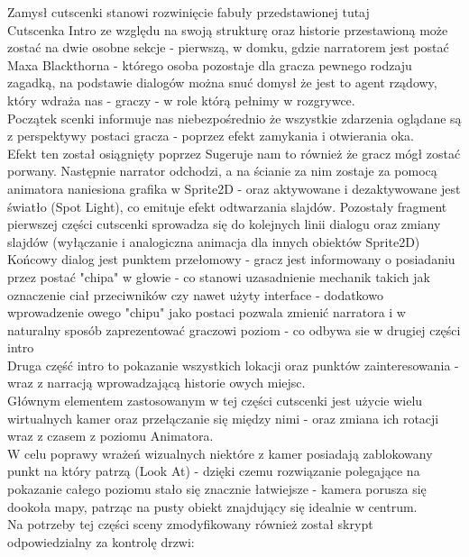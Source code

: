Zamysł cutscenki stanowi rozwinięcie fabuły przedstawionej tutaj  \\
Cutscenka Intro ze względu na swoją strukturę oraz historie przestawioną może zostać na dwie osobne sekcje - pierwszą, w domku, gdzie narratorem jest postać Maxa Blackthorna - którego osoba pozostaje dla gracza pewnego rodzaju zagadką, na podstawie dialogów można snuć domysł że jest to agent rządowy, który wdraża nas - graczy - w role którą pełnimy w rozgrywce.\\
Początek scenki informuje nas niebezpośrednio że wszystkie zdarzenia oglądane są z perspektywy postaci gracza - poprzez efekt zamykania i otwierania oka.\\
Efekt ten został osiągnięty poprzez 
Sugeruje nam to również że gracz mógł zostać porwany.
Następnie narrator odchodzi, a na ścianie za nim zostaje za pomocą animatora naniesiona grafika w Sprite2D - oraz aktywowane i dezaktywowane jest światło (Spot Light), co emituje efekt odtwarzania slajdów.
Pozostały fragment pierwszej części cutscenki sprowadza się do kolejnych linii dialogu oraz zmiany slajdów (wyłączanie i analogiczna animacja dla innych obiektów Sprite2D)\\
Końcowy dialog jest punktem przełomowy - gracz jest informowany o posiadaniu przez postać "chipa" w głowie - co stanowi uzasadnienie mechanik takich jak oznaczenie ciał przeciwników czy nawet użyty interface - dodatkowo wprowadzenie owego "chipu" jako postaci pozwala zmienić narratora i w naturalny sposób zaprezentować graczowi poziom - co odbywa sie w drugiej części intro\\
Druga część intro to pokazanie wszystkich lokacji oraz punktów zainteresowania - wraz z narracją wprowadzającą historie owych miejsc.\\
Głównym elementem zastosowanym w tej części cutscenki jest użycie wielu wirtualnych kamer oraz przełączanie się między nimi - oraz zmiana ich rotacji wraz z czasem z poziomu Animatora.\\
W celu poprawy wrażeń wizualnych niektóre z kamer posiadają zablokowany punkt na który patrzą (Look At) - dzięki czemu rozwiązanie polegające na pokazanie całego poziomu stało się znacznie łatwiejsze - kamera porusza się dookoła mapy, patrząc na pusty obiekt znajdujący się idealnie w centrum.\\
Na potrzeby tej części sceny zmodyfikowany również został skrypt odpowiedzialny za kontrolę drzwi:
